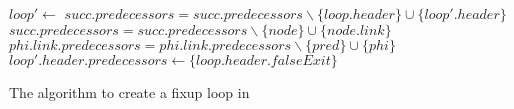 \begin{algorithm}[H]
    \begin{algorithmic}
            \State $loop' \gets $ 
                    \State $succ.predecessors = succ.predecessors \backslash \{loop.header\} \cup \{loop'.header\}$
                \EndIf
            \EndFor
                        \State $succ.predecessors = succ.predecessors \backslash \{node\} \cup \{node.link\}$
                    \EndIf
                \EndFor
            \EndFor
                        \State $phi.link.predecessors =phi.link.predecessors \backslash \{pred\} \cup \{phi\}$
                    \EndIf
                \EndFor
            \EndFor
            \State $loop'.header.predecessors \gets \{loop.header.falseExit\}$
        \EndFunction
    \end{algorithmic}
    \caption{The algorithm to create a fixup loop in~\libFIRM}
    \label{alg:impl:fixup:loop:fixup-loop}
\end{algorithm}